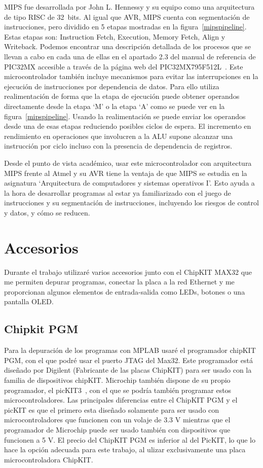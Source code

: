 
MIPS fue desarrollada por John L. Hennessy y su equipo como una arquitectura de tipo RISC de 32~bits. Al igual que AVR, MIPS cuenta con segmentación de instrucciones, pero dividido en 5 etapas mostradas en la figura~\ref{mipspipeline}. Estas etapas son: Instruction Fetch, Execution, Memory Fetch, Align y Writeback. Podemos encontrar una descripción detallada de los procesos que se llevan a cabo en cada una de ellas en el apartado 2.3 del manual de referencia de PIC32MX accesible a través de la página web del PIC32MX795F512L~\cite{website:pic32mx}. Este microcontrolador también incluye mecanismos para evitar las interrupciones en la ejecución de instrucciones por dependencia de datos. Para ello utiliza realimentación de forma que la etapa de ejecución puede obtener operandos directamente desde la etapa `M' o la etapa `A' como se puede ver en la figura~\ref{mipspipeline}. Usando la realimentación se puede enviar los operandos desde una de esas etapas reduciendo posibles ciclos de espera. El incremento en rendimiento en operaciones que involucren a la ALU supone alcanzar una instrucción por ciclo incluso con la presencia de dependencia de registros.

Desde el punto de vista académico, usar este microcontrolador con arquitectura MIPS frente al Atmel y su AVR tiene la ventaja de que MIPS se estudia en la asignatura `Arquitectura de computadores y sistemas operativos I'. Esto ayuda a la hora de desarrollar programas al estar ya familiarizado con el juego de instrucciones y su segmentación de instrucciones, incluyendo los riesgos de control y datos, y cómo se reducen.

\section{Accesorios}
Durante el trabajo utilizaré varios accesorios junto con el ChipKIT MAX32 que me permiten depurar programas, conectar la placa a la red Ethernet y me proporcionan algunos elementos de entrada-salida como LEDs, botones o una pantalla OLED.\@
\subsection{Chipkit PGM}
Para la depuración de los programas con MPLAB usaré el programador chipKIT PGM\cite{website:pgm}, con el que podré usar el puerto JTAG del Max32. Este programador está diseñado por Digilent (Fabricante de las placas ChipKIT) para ser usado con la familia de dispositivos chipKIT. Microchip también dispone de su propio programador, el picKIT3~\cite{website:pickit}, con el que se podría también programar estos microcontroladores. Las principales diferencias entre el ChipKIT PGM y el picKIT es que el primero esta diseñado solamente para ser usado con microcontroladores que funcionen con un volaje de 3.3 V mientras que el programador de Microchip puede ser usado también con dispositivos que funcionen a 5 V. El precio del ChipKIT PGM es inferior al del PicKIT, lo que lo hace la opción adecuada para este trabajo, al ulizar exclusivamente una placa microcontroladora ChipKIT.

